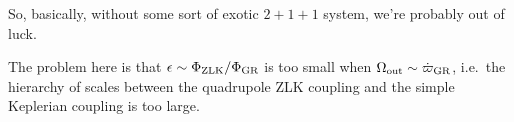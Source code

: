 \documentclass[11pt,
        usenames, %
        dvipsnames %
    ]{article}
\begin{document}
So, basically, without some sort of exotic $2+1+1$ system, we're probably out of
luck.

The problem here is that $\epsilon \sim \Phi_{\rm ZLK} / \Phi_{\rm GR}$ is too
small when $\Omega_{\rm out} \sim \dot{\varpi}_{\rm GR}$, i.e.\ the hierarchy of
scales between the quadrupole ZLK coupling and the simple Keplerian coupling is
too large.
\end{document}
